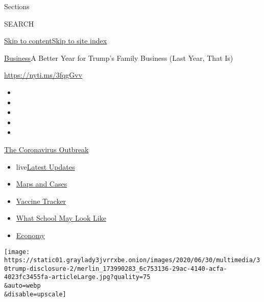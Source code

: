 Sections

SEARCH

\protect\hyperlink{site-content}{Skip to
content}\protect\hyperlink{site-index}{Skip to site index}

\href{/section/business}{Business}\textbar{}A Better Year for Trump's
Family Business (Last Year, That Is)

\url{https://nyti.ms/3fqgGvv}

\begin{itemize}
\item
\item
\item
\item
\item
\end{itemize}

\href{https://www.nytimes3xbfgragh.onion/news-event/coronavirus?action=click\&pgtype=Article\&state=default\&region=TOP_BANNER\&context=storylines_menu}{The
Coronavirus Outbreak}

\begin{itemize}
\tightlist
\item
  live\href{https://www.nytimes3xbfgragh.onion/2020/08/01/world/coronavirus-covid-19.html?action=click\&pgtype=Article\&state=default\&region=TOP_BANNER\&context=storylines_menu}{Latest
  Updates}
\item
  \href{https://www.nytimes3xbfgragh.onion/interactive/2020/us/coronavirus-us-cases.html?action=click\&pgtype=Article\&state=default\&region=TOP_BANNER\&context=storylines_menu}{Maps
  and Cases}
\item
  \href{https://www.nytimes3xbfgragh.onion/interactive/2020/science/coronavirus-vaccine-tracker.html?action=click\&pgtype=Article\&state=default\&region=TOP_BANNER\&context=storylines_menu}{Vaccine
  Tracker}
\item
  \href{https://www.nytimes3xbfgragh.onion/interactive/2020/07/29/us/schools-reopening-coronavirus.html?action=click\&pgtype=Article\&state=default\&region=TOP_BANNER\&context=storylines_menu}{What
  School May Look Like}
\item
  \href{https://www.nytimes3xbfgragh.onion/live/2020/07/31/business/stock-market-today-coronavirus?action=click\&pgtype=Article\&state=default\&region=TOP_BANNER\&context=storylines_menu}{Economy}
\end{itemize}

\texttt{[image: https://static01.graylady3jvrrxbe.onion/images/2020/06/30/multimedia/30trump-disclosure-2/merlin\_173990283\_6c753136-29ac-4140-acfa-4023fc3455fa-articleLarge.jpg?quality=75\\\&auto=webp\\\&disable=upscale]}

